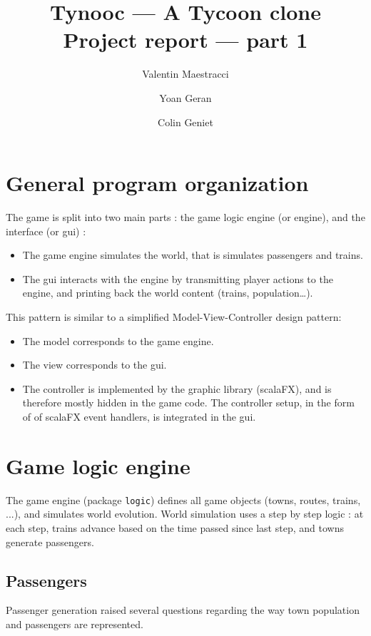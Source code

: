 \documentclass{article}
\begin{document}
\title{Tynooc --- A Tycoon clone \\ \large{Project report --- part 1}}
\author{Valentin Maestracci \and Yoan Geran \and Colin Geniet}
\maketitle

\tableofcontents

\section{General program organization}
The game is split into two main parts : the game logic engine (or engine), and the interface (or gui) :
\begin{itemize}
\item The game engine simulates the world, that is simulates passengers and trains.
\item The gui interacts with the engine by transmitting player actions to the engine, 
and printing back the world content (trains, population\dots).
\end{itemize}

This pattern is similar to a simplified Model-View-Controller design pattern:
\begin{itemize}[noitemsep]
\item The model corresponds to the game engine.
\item The view corresponds to the gui.
\item The controller is implemented by the graphic library (scalaFX), and is therefore mostly hidden in the game code.
The controller setup, in the form of of scalaFX event handlers, is integrated in the gui.
\end{itemize}



\section{Game logic engine}
The game engine (package \verb|logic|) defines all game objects (towns, routes, trains, ...), and simulates world evolution.
World simulation uses a step by step logic : at each step, trains advance based on the time passed since last step,
and towns generate passengers.

\subsection{Passengers}
Passenger generation raised several questions regarding the way town population and passengers are represented.
\end{document}
